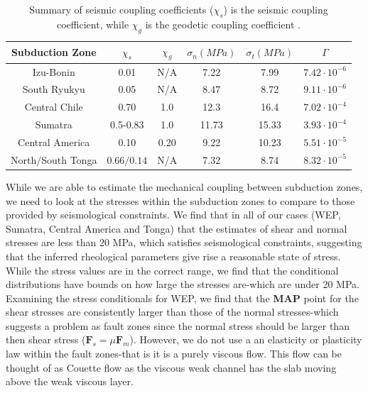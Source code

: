 \documentclass[12pt]{article}
\begin{document}
   \begin{table}[H]
  \caption{Summary of seismic coupling coefficients ($\chi_s$) is the seismic coupling coefficient, while $\chi_g$ is the geodetic coupling coefficient \citep{scholz2012seismic}.} %
  \centering  %
  \begin{tabular}{c c c c c c} %
    \hline \hline                        %
    Subduction Zone & $\chi_s$ & $\chi_g$ & $\sigma_n (MPa)$ & $\sigma_t (MPa)$ & $\Gamma$ \\ [0.5ex] %
    \hline                  %
    Izu-Bonin &0.01 &N/A &7.22 &7.99 & $7.42 \cdot 10^{-6}$\\
    South Ryukyu  &0.05 &N/A &8.47&8.72 & $9.11 \cdot 10^{-6}$\\
    Central Chile &0.70 &1.0 &12.3 &16.4 & $7.02 \cdot 10^{-4}$ \\
    Sumatra &0.5-0.83 &1.0 &11.73 & 15.33 &$3.93 \cdot 10^{-4}$\\
    Central America &0.10 &0.20 &9.22 & 10.23 & $5.51 \cdot 10^{-5}$ \\
    North$/$South Tonga & $0.66/0.14$ &N/A &7.32 & 8.74 & $8.32 \cdot 10^{-5}$ \\
    \hline %
  \end{tabular}
  \label{table:coupling_summary} %
\end{table}

   
   While we are able to estimate the mechanical coupling between subduction zones, we need to look at the stresses within the subduction zones to compare to those provided by seismological constraints. We find that in all of our cases (WEP, Sumatra, Central America and Tonga) that the estimates of shear and normal stresses are less than 20 MPa, which satisfies seismological constraints, suggesting that the inferred rheological parameters give rise a reasonable state of stress. While the stress values are in the correct range, we find that the conditional distributions have bounds on how large the stresses are-which are under 20 MPa. Examining the stress conditionals for WEP, we find that the \textbf{MAP} point for the shear stresses are consistently larger than those of the normal stresses-which suggests a problem as fault zones since the normal stress should be larger than then shear stress ($\textbf{F}_s = \mu\textbf{F}_m$). However, we do not use a an elasticity or plasticity law within the fault zones-that is it is a purely viscous flow. This flow can be thought of as Couette flow as the viscous weak channel has the slab moving above the weak viscous layer.
   
\end{document}
